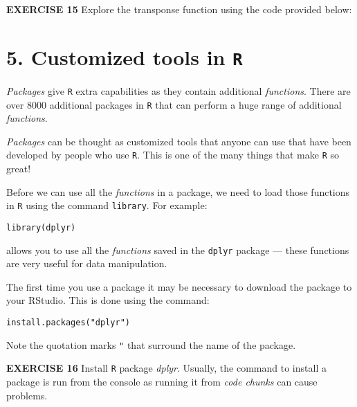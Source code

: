 \documentclass[
]{article}
\newenvironment{Shaded}{\begin{snugshade}}{\end{snugshade}}
\newcommand{\CommentTok}[1]{\textcolor[rgb]{0.56,0.35,0.01}{\textit{#1}}}
\newcommand{\DataTypeTok}[1]{\textcolor[rgb]{0.13,0.29,0.53}{#1}}
\newcommand{\DecValTok}[1]{\textcolor[rgb]{0.00,0.00,0.81}{#1}}
\newcommand{\KeywordTok}[1]{\textcolor[rgb]{0.13,0.29,0.53}{\textbf{#1}}}
\newcommand{\NormalTok}[1]{#1}
\newcommand{\OperatorTok}[1]{\textcolor[rgb]{0.81,0.36,0.00}{\textbf{#1}}}
\newcommand{\StringTok}[1]{\textcolor[rgb]{0.31,0.60,0.02}{#1}}
\begin{document}
\textbf{EXERCISE 15} Explore the transponse function using the code
provided below:

\begin{Shaded}
\end{Shaded}

\hypertarget{customized-tools-in-r}{%
\section{\texorpdfstring{5. Customized tools in
\texttt{R}}{5. Customized tools in R}}\label{customized-tools-in-r}}

\emph{Packages} give \texttt{R} extra capabilities as they contain
additional \emph{functions}. There are over 8000 additional packages in
\texttt{R} that can perform a huge range of additional \emph{functions}.

\emph{Packages} can be thought as customized tools that anyone can use
that have been developed by people who use \texttt{R}. This is one of
the many things that make \texttt{R} so great!

Before we can use all the \emph{functions} in a package, we need to load
those functions in \texttt{R} using the command \texttt{library}. For
example:

\texttt{library(dplyr)}

allows you to use all the \emph{functions} saved in the \texttt{dplyr}
package --- these functions are very useful for data manipulation.

The first time you use a package it may be necessary to download the
package to your RStudio. This is done using the command:

\texttt{install.packages("dplyr")}

Note the quotation marks \texttt{"} that surround the name of the
package.

\textbf{EXERCISE 16} Install \texttt{R} package \emph{dplyr}. Usually,
the command to install a package is run from the console as running it
from \emph{code chunks} can cause problems.
\end{document}
